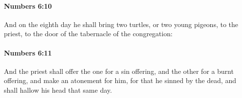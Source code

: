 		\paragraph{Numbers 6:10} %
			\label{NUMBERS-6-10}

			And on the eighth day he shall bring two turtles, or two young pigeons, to the priest, to the door of the tabernacle of the congregation:


		\paragraph{Numbers 6:11} %
			\label{NUMBERS-6-11}

			And the priest shall offer the one for a sin offering, and the other for a burnt offering, and make an atonement for him, for that he sinned by the dead, and shall hallow his head that same day.


